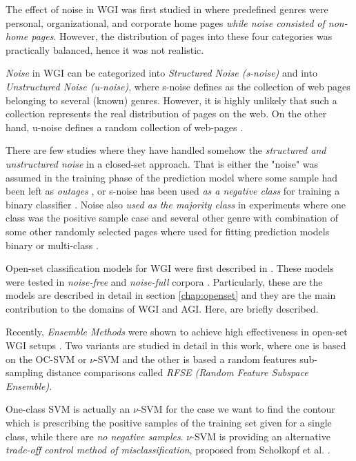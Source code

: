 The effect of noise in WGI  was first studied in \parencite{shepherd2004cybergenre,kennedy2005automatic,dong2006binary,levering2008using} where predefined genres were personal, organizational, and corporate home pages \textit{while noise consisted of non-home pages}. However, the distribution of pages into these four categories was practically balanced, hence it was not realistic.

\textit{Noise} in WGI can be categorized into \textit{Structured Noise (s-noise)} and into \textit{Unstructured Noise (u-noise)}, where s-noise defines as the collection of web pages belonging to several (known) genres. However, it is highly unlikely that such a collection  represents the real distribution of pages on the web. On the other hand, u-noise defines a random collection of web-pages \parencite{santini2011cross}.

There are few studies where they have handled somehow the \textit{structured and unstructured noise} in a closed-set approach. That is either the "noise" was assumed in the training phase of the prediction model where some sample had been left as \textit{outages} \parencite{jebari2015combination}, or s-noise has been used \textit{as a negative class} for training a binary classifier \parencite{Vidulin2007}. Noise also\textit{ used as the majority class} in experiments where one class was the positive sample case and several other genre with combination of some other randomly selected pages where used for fitting prediction models binary or multi-class \parencite{dong2006binary,levering2008using}. 

Open-set classification models for WGI were first described in \parencite{pritsos2013open,stubbe2007genre}. These models were tested in \textit{noise-free} and \textit{noise-full} corpora \parencite{pritsos2015clef,pritsos2018open,pritsos2019open}. Particularly, these are the models are described in detail in section \ref{chap:openset} and they are the main contribution to the domains of WGI and AGI. Here, are briefly described.

Recently, \textit{Ensemble Methods} were shown to achieve high effectiveness in open-set WGI setups \parencite{pritsos2013open,pritsos2015clef,pritsos2018open,pritsos2019open}. Two variants are studied in detail in this work, where one is based on the OC-SVM or $\nu$-SVM and the other is based a random features sub-sampling distance comparisons called \textit{RFSE (Random Feature Subspace Ensemble)}. 

One-class SVM is actually an $\nu$-SVM for the case we want to find the contour which is prescribing the positive samples of the training set given for a single class, while there are \textit{no negative samples}. $\nu$-SVM is providing an alternative \textit{trade-off control method of misclassification}, proposed from Scholkopf et al. . 

